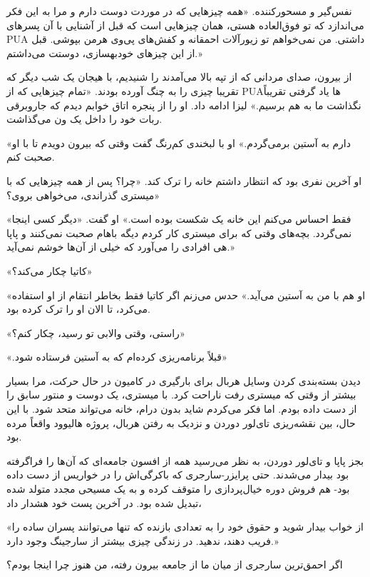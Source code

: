 
نفس‌گیر و مسحورکننده. «همه چیزهایی که در موردت دوست دارم و مرا به این فکر می‌اندازد که تو فوق‌العاده هستی، همان چیزهایی است که قبل از آشنایی با آن پسرهای PUA داشتی. من نمی‌خواهم تو زیورآلات احمقانه و کفش‌های پی‌وی هرمن بپوشی. قبل از این چیزهای خودبهسازی، دوستت می‌داشتم.»

از بیرون، صدای مردانی که از تپه بالا می‌آمدند را شنیدیم، با هیجان یک شب دیگر که تقریبا چیزی را به چنگ آورده بودند. «تمام چیزهایی که از PUAها یاد گرفتی تقریباً نگذاشت ما به هم برسیم.» لیزا ادامه داد. او را از پنجره اتاق خوابم دیدم که جاروبرقی ربات خود را داخل یک ون  می‌گذاشت.

«دارم به آستین برمی‌گردم.» او با لبخندی کم‌رنگ گفت وقتی که بیرون دویدم تا با او صحبت کنم.

او آخرین نفری بود که انتظار داشتم خانه را ترک کند. «چرا؟ پس از همه چیزهایی که با میستری گذراندی، می‌خواهی بروی؟»

«فقط احساس می‌کنم این خانه یک شکست بوده است.» او گفت. «دیگر کسی اینجا نمی‌گردد. بچه‌های  وقتی که برای میستری کار کردم دیگه باهام صحبت نمی‌کنند و پاپا هی افرادی را می‌آورد که خیلی از آن‌ها خوشم نمی‌آید.»

«کاتیا چکار می‌کند؟»

«او هم با من به آستین می‌آید.» حدس می‌زنم اگر کاتیا فقط بخاطر انتقام از او استفاده می‌کرد، تا الان او را ترک کرده بود.

«راستی، وقتی والابی تو رسید، چکار کنم؟»

«.قبلاً برنامه‌ریزی کرده‌ام که به آستین فرستاده شود»

دیدن بسته‌بندی کردن وسایل هربال برای بارگیری در کامیون در حال حرکت، مرا بسیار بیشتر از وقتی که میستری رفت ناراحت کرد. با میستری، یک دوست و منتور سابق را از دست داده بودم. اما فکر می‌کردم شاید بدون درام، خانه می‌تواند متحد شود. با این حال، بین نقشه‌ریزی تای‌لور دوردن و نزدیک به رفتن هربال، پروژه هالیوود واقعاً مرده بود.

بجز پاپا و تای‌لور دوردن، به نظر می‌رسید همه از افسون جامعه‌ای که آن‌ها را فراگرفته بود بیدار می‌شدند. حتی پرایزر-سارجری که باکرگی‌اش را در خواریس از دست داده بود- هم فروش دوره  خیال‌پردازی را متوقف کرده و به یک مسیحی مجدد متولد شده تبدیل شده بود. در آخرین پست خود هشدار داد،

«از خواب بیدار شوید و حقوق خود را به تعدادی بازنده که تنها می‌توانند پسران ساده را فریب دهند، ندهید. در زندگی چیزی بیشتر از سارجینگ وجود دارد.»

اگر احمق‌ترین سارجری از میان ما از جامعه بیرون رفته، من هنوز چرا اینجا بودم؟

